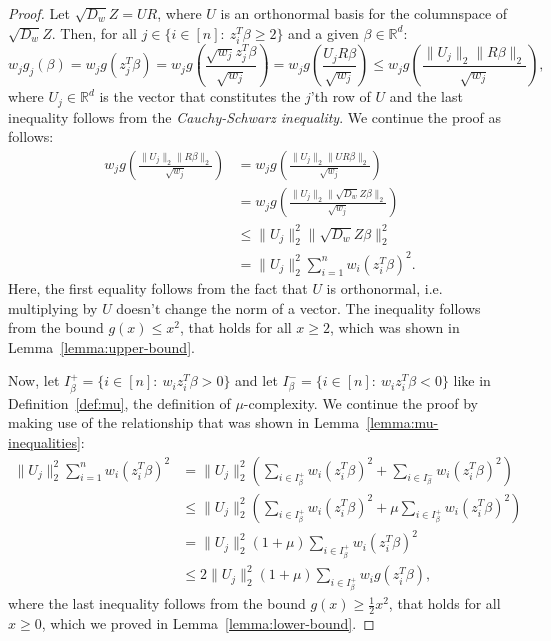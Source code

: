 \begin{proof}
    Let $\sqrt{D_w} Z = UR$, where $U$ is an orthonormal basis for the columnspace
    of $\sqrt{D_w} Z$. Then, for all $j \in \{i \in [n]:\ z_i^T \beta \geq 2 \}$
    and a given $\beta \in \mathbb{R}^d$:
    \begin{equation*}
        w_jg_j(\beta) = w_j g(z_j^T \beta)
        = w_j g\left(\frac{\sqrt{w_j} z_j^T \beta}{\sqrt{w_j}}\right)
        = w_j g\left(\frac{U_j R \beta}{\sqrt{w_j}}\right)
        \leq w_j g\left(\frac{\lVert U_j \rVert_2 \lVert R \beta \rVert_2}{\sqrt{w_j}}\right),
    \end{equation*}
    where $U_j \in \mathbb{R}^d$ is the vector that constitutes the $j$'th
    row of $U$ and the last inequality follows from the
    \textit{Cauchy-Schwarz inequality}. We continue the proof as follows:
    \begin{align*}
        w_j g\left(\frac{\lVert U_j \rVert_2 \lVert R \beta \rVert_2}{\sqrt{w_j}}\right)
         & = w_j g\left(\frac{\lVert U_j \rVert_2 \lVert U R \beta \rVert_2}{\sqrt{w_j}}\right)          \\
         & = w_j g\left(\frac{\lVert U_j \rVert_2 \lVert \sqrt{D_w} Z \beta \rVert_2}{\sqrt{w_j}}\right) \\
         & \leq \lVert U_j \rVert_2^2 \lVert \sqrt{D_w} Z \beta \rVert_2^2                               \\
         & = \lVert U_j \rVert_2^2 \sum_{i=1}^n w_i (z_i^T \beta)^2.
    \end{align*}
    Here, the first equality follows from the fact that $U$ is orthonormal, i.e.
    multiplying by $U$ doesn't change the norm of a vector.
    The inequality follows from the bound $g(x) \leq x^2$, that holds for
    all $x \geq 2$, which was shown in Lemma~\ref{lemma:upper-bound}.

    Now, let $I_\beta^+ = \{i \in [n]:\ w_i z_i^T \beta > 0 \}$
    and let $I_\beta^- = \{i \in [n]:\ w_i z_i^T \beta < 0 \}$ like in
    Definition~\ref{def:mu}, the definition of $\mu$-complexity.
    We continue the proof by making use of the relationship that
    was shown in Lemma~\ref{lemma:mu-inequalities}:
    \begin{align*}
        \lVert U_j \rVert_2^2 \sum_{i=1}^n w_i (z_i^T \beta)^2
         & = \lVert U_j \rVert_2^2 \left( \sum_{i \in I_\beta^+} w_i (z_i^T \beta)^2 + \sum_{i \in I_\beta^-} w_i (z_i^T \beta)^2 \right)        \\
         & \leq \lVert U_j \rVert_2^2 \left( \sum_{i \in I_\beta^+} w_i (z_i^T \beta)^2 + \mu \sum_{i \in I_\beta^+} w_i (z_i^T \beta)^2 \right) \\
         & = \lVert U_j \rVert_2^2 (1 + \mu) \sum_{i \in I_\beta^+} w_i (z_i^T \beta)^2                                                          \\
         & \leq 2 \lVert U_j \rVert_2^2 (1 + \mu) \sum_{i \in I_\beta^+} w_i g(z_i^T \beta),
    \end{align*}
    where the last inequality follows from the bound
    $g(x) \geq \frac{1}{2}x^2$, that holds for all $x \geq 0$,
    which we proved in Lemma~\ref{lemma:lower-bound}.


\end{proof}
